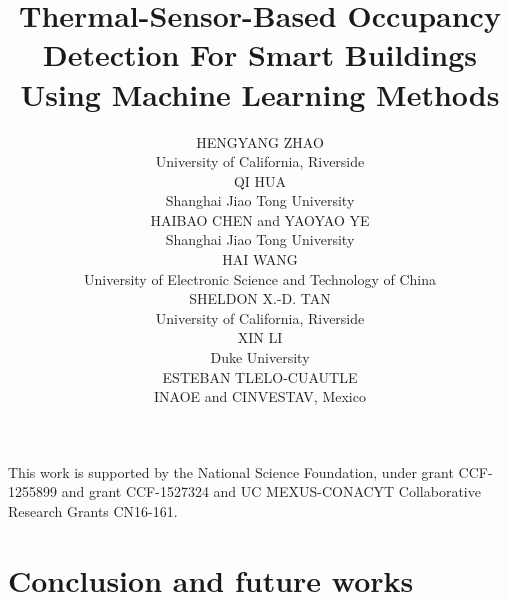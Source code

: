\documentclass[acmtodaes]{acmtrans2m}
\title{Thermal-Sensor-Based Occupancy Detection For Smart Buildings Using Machine Learning Methods}
\author{ \small
HENGYANG ZHAO\\
University of California, Riverside\\
QI HUA \\
Shanghai Jiao Tong University\\
HAIBAO CHEN and YAOYAO YE\\
Shanghai Jiao Tong University\\
HAI WANG \\
University of Electronic Science and Technology of China\\
SHELDON X.-D. TAN \\
University of California, Riverside\\
XIN LI\\
Duke University\\
ESTEBAN TLELO-CUAUTLE \\
INAOE and CINVESTAV, Mexico
}
\let\orgsetcounter\setcounter
\begin{document}
{\let\setcounter\orgsetcounter
\begin{bottomstuff}
\newline \indent
This work is supported by the National Science Foundation, under
  grant CCF-1255899 and grant CCF-1527324 and UC MEXUS-CONACYT
  Collaborative Research Grants CN16-161.

\end{bottomstuff}
}

\maketitle











%
%
%
%

\section{Conclusion and future works}
\label{sec:conclution}
\end{document}
